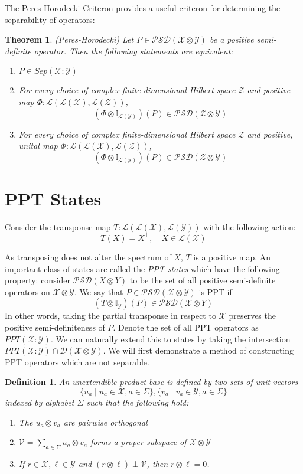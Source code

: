 \documentclass[12pt]{article}
\newcommand{\X}{\mathcal{X}}
\newcommand{\Y}{\mathcal{Y}}
\newcommand{\Z}{\mathcal{Z}}
\newcommand{\LX}{\mathcal{L}(\mathcal{X})}
\newcommand{\LY}{\mathcal{L}(\mathcal{Y})}
\newcommand{\LZ}{\mathcal{L}(\mathcal{Z})}
\newtheorem{definition}{Definition}
\newtheorem{theorem}{Theorem}
\begin{document}
The Peres-Horodecki Criteron provides a useful criteron for determining the separability of operators:
\begin{theorem}{(Peres-Horodecki)}
 Let $P \in \mathcal{PSD}(\X \otimes \Y)$ be a positive semi-definite operator. Then the following statements are equivalent:
 \begin{enumerate}
   \item $P \in Sep(\X:\Y)$
   \item For every choice of complex finite-dimensional Hilbert space $\mathcal{Z}$ and positive map $\Phi:\mathcal{L}(\LX, \LZ)$,
         $$ (\Phi \otimes \mathbb{I}_{\LY})(P) \in \mathcal{PSD}(\Z \otimes \Y) $$
  \item  For every choice of complex finite-dimensional Hilbert space $\mathcal{Z}$ and positive, unital map $\Phi:\mathcal{L}(\LX, \LZ)$,
        $$ (\Phi \otimes \mathbb{I}_{\LY})(P) \in \mathcal{PSD}(\Z \otimes \Y) $$
 \end{enumerate}
\end{theorem}

\section{PPT States}
 Consider the transponse map $T: \mathcal{L}(\mathcal{L}(\mathcal{X}), \mathcal{L}(\mathcal{Y}))$ with the following action:
\[
T(X) = X^{\intercal}, \quad X \in \LX
\]

As transposing does not alter the spectrum of $X$, $T$ is a positive map. An important class of states are called the \emph{PPT states} which have the following property: consider $\mathcal{PSD}(X \otimes Y)$ to be the set of all positive semi-definite operators on $\X \otimes \Y$. We say that $P \in \mathcal{PSD}(\X \otimes \Y)$ is PPT if
\[
(T \otimes \mathbb{I}_\Y)(P) \in \mathcal{PSD}(\X \otimes Y)
\]
In other words, taking the partial transponse in respect to $\X$ preserves the positive semi-definiteness of $P$. Denote the set of all PPT operators as $PPT(\X : \Y)$. We can naturally extend this to states by taking the intersection $PPT(\X : \Y) \cap \mathcal{D}(\X \otimes \Y)$. We will first demonstrate a method of constructing PPT operators which are not separable.

\begin{definition}
  An \emph{unextendible product base} is defined by two sets of unit vectors
  \[ \{u_a \mid  u_a \in \X, a \in \Sigma\}, \{v_a \mid v_a \in \Y, a \in \Sigma\} \]
  indexed by alphabet $\Sigma$ such that the following hold:
  \begin{enumerate}
    \item The $u_a \otimes v_a$ are pairwise orthogonal
    \item $\mathcal{V} = \sum_{a \in \Sigma} u_a \otimes v_a$ forms a \emph{proper} subspace of $\X \otimes \Y$
    \item If $r \in \X, \ell \in \Y$ and $(r \otimes \ell) \perp \mathcal{V}$, then $r \otimes \ell = 0$.
  \end{enumerate}
\end{definition}
\end{document}
